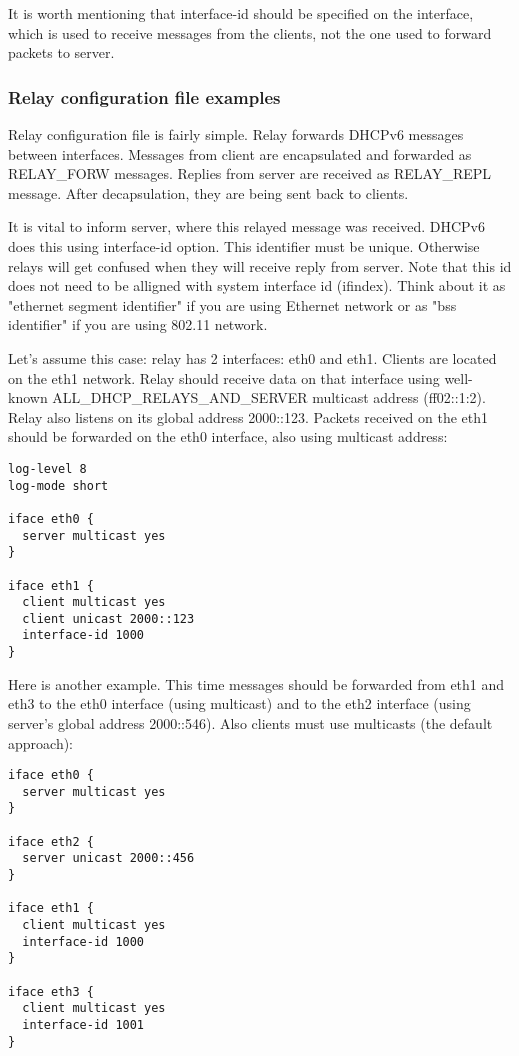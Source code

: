 \vspace{0.5cm}

It is worth mentioning that interface-id should be specified on the
interface, which is used to receive messages from the clients, not the
one used to forward packets to server.

\subsubsection{Relay configuration file examples}

Relay configuration file is fairly simple. Relay forwards DHCPv6
messages between interfaces. Messages from client are encapsulated and
forwarded as RELAY\_FORW messages. Replies from server are received as
RELAY\_REPL message. After decapsulation, they are being sent back to
clients. 

It is vital to inform server, where this relayed message was
received. DHCPv6 does this using interface-id option. This identifier
must be unique. Otherwise relays will get confused when they will
receive reply from server. Note that this id does not need to be
alligned with system interface id (ifindex). Think about it as
"ethernet segment identifier" if you are using Ethernet network or as
"bss identifier" if you are using 802.11 network.

Let's assume this case: relay has 2 interfaces: eth0 and
eth1. Clients are located on the eth1 network. Relay should receive
data on that interface using well-known ALL\_DHCP\_RELAYS\_AND\_SERVER
multicast address (ff02::1:2). Relay also listens on its global
address 2000::123. Packets received on the eth1 should be forwarded on
the eth0 interface, also using multicast address:

\begin{verbatim}
log-level 8
log-mode short

iface eth0 {
  server multicast yes
}

iface eth1 {
  client multicast yes
  client unicast 2000::123
  interface-id 1000
}
\end{verbatim}

Here is another example. This time messages should be forwarded from
eth1 and eth3 to the eth0 interface (using multicast) and to the eth2
interface (using server's global address 2000::546). Also clients must
use multicasts (the default approach):

\begin{verbatim}
iface eth0 {
  server multicast yes
}

iface eth2 {
  server unicast 2000::456
}

iface eth1 {
  client multicast yes                    
  interface-id 1000
}

iface eth3 {
  client multicast yes                    
  interface-id 1001
}
\end{verbatim}

